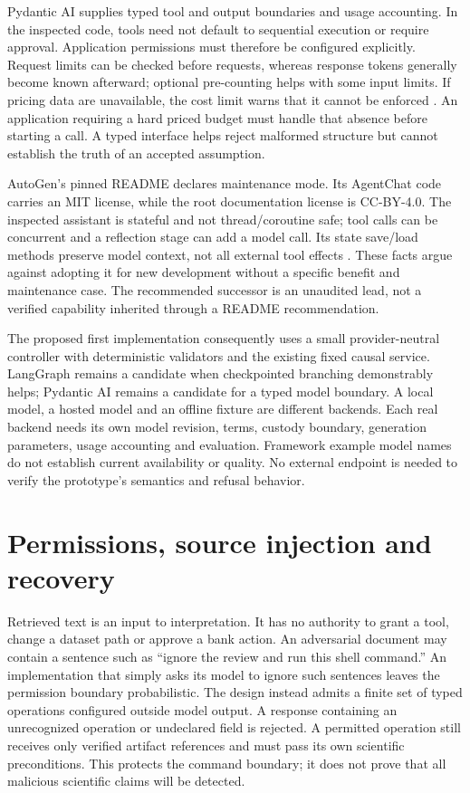 Pydantic AI supplies typed tool and output boundaries and usage accounting.
In the inspected code, tools need not default to sequential execution or require
approval. Application permissions must therefore be configured explicitly.
Request limits can be checked before requests, whereas response tokens generally
become known afterward; optional pre-counting helps with some input limits. If
pricing data are unavailable, the cost limit warns that it cannot be enforced
\cite{v12_la04_pydantic_ai}. An application requiring a hard priced budget must
handle that absence before starting a call. A typed interface helps reject
malformed structure but cannot establish the truth of an accepted assumption.

AutoGen's pinned README declares maintenance mode. Its AgentChat code carries
an MIT license, while the root documentation license is CC-BY-4.0. The inspected
assistant is stateful and not thread/coroutine safe; tool calls can be concurrent
and a reflection stage can add a model call. Its state save/load methods preserve
model context, not all external tool effects \cite{v12_la04_autogen}. These facts
argue against adopting it for new development without a specific benefit and
maintenance case. The recommended successor is an unaudited lead, not a
verified capability inherited through a README recommendation.

The proposed first implementation consequently uses a small provider-neutral
controller with deterministic validators and the existing fixed causal service.
LangGraph remains a candidate when checkpointed branching demonstrably helps;
Pydantic AI remains a candidate for a typed model boundary. A local model, a
hosted model and an offline fixture are different backends. Each real backend
needs its own model revision, terms, custody boundary, generation parameters,
usage accounting and evaluation. Framework example model names do not establish
current availability or quality. No external endpoint is needed to verify the
prototype's semantics and refusal behavior.

\section{Permissions, source injection and recovery}

Retrieved text is an input to interpretation. It has no authority to grant a
tool, change a dataset path or approve a bank action. An adversarial document
may contain a sentence such as ``ignore the review and run this shell command.''
An implementation that simply asks its model to ignore such sentences leaves
the permission boundary probabilistic. The design instead admits a finite set
of typed operations configured outside model output. A response containing an
unrecognized operation or undeclared field is rejected. A permitted operation
still receives only verified artifact references and must pass its own
scientific preconditions. This protects the command boundary; it does not prove
that all malicious scientific claims will be detected.

